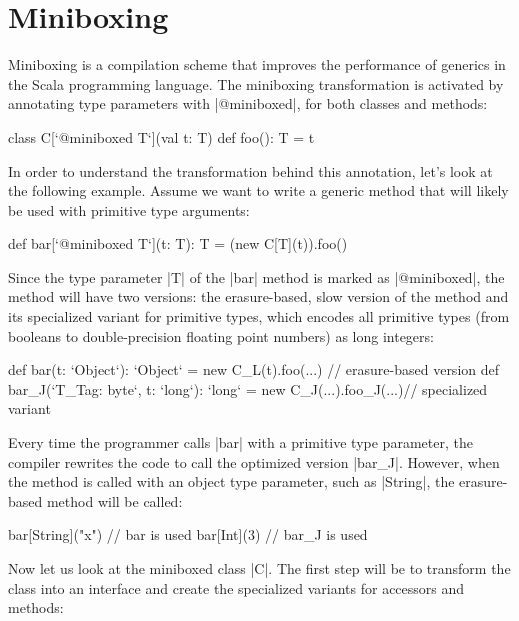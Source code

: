 \section{Miniboxing}

Miniboxing \cite{miniboxing, miniboxing-www} is a compilation scheme that improves the performance of generics in the Scala programming language. The miniboxing transformation is activated by annotating type parameters with |@miniboxed|, for both classes and methods:

\begin{lstlisting-nobreak}
class C[`@miniboxed T`](val t: T) {
  def foo(): T = t
}
\end{lstlisting-nobreak}

In order to understand the transformation behind this annotation, let's look at the following example. Assume we want to write a generic method that will likely be used with primitive type arguments:

\begin{lstlisting-nobreak}
def bar[`@miniboxed T`](t: T): T =
  (new C[T](t)).foo()
\end{lstlisting-nobreak}

Since the type parameter |T| of the |bar| method is marked as |@miniboxed|, the method will have two versions: the erasure-based, slow version of the method and its specialized variant for primitive types, which encodes all primitive types (from booleans to double-precision floating point numbers) as long integers:

\begin{lstlisting-nobreak}
def bar(t: `Object`): `Object` =
  new C_L(t).foo(...)            // erasure-based version
def bar_J(`T_Tag: byte`, t: `long`): `long` =
  new C_J(...).foo_J(...)// specialized variant
\end{lstlisting-nobreak}

Every time the programmer calls |bar| with a primitive type parameter, the compiler rewrites the code to call the optimized version |bar_J|. However, when the method is called with an object type parameter, such as |String|, the erasure-based method will be called:

\begin{lstlisting-nobreak}
bar[String]("x")  // bar is used
bar[Int](3)           // bar_J is used
\end{lstlisting-nobreak}

Now let us look at the miniboxed class |C|. The first step will be to transform the class into an interface and create the specialized variants for accessors and methods:

